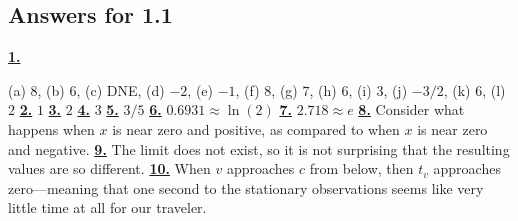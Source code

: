 \subsection *{Answers for 1.1}
\hypertarget {a:1.1.1}{\hyperlink {e:1.1.1}{\bfseries 1.}} \mdseries (a) $8$, (b) $6$, (c) DNE, (d) $-2$, (e) $-1$, (f) $8$, (g) $7$, (h) $6$, (i) $3$, (j) $-3/2$, (k) $6$, (l) $2$\qquad 
\hypertarget {a:1.1.2}{\hyperlink {e:1.1.2}{\bfseries 2.}} \mdseries $1$\qquad 
\hypertarget {a:1.1.3}{\hyperlink {e:1.1.3}{\bfseries 3.}} \mdseries $2$\qquad 
\hypertarget {a:1.1.4}{\hyperlink {e:1.1.4}{\bfseries 4.}} \mdseries $3$\qquad 
\hypertarget {a:1.1.5}{\hyperlink {e:1.1.5}{\bfseries 5.}} \mdseries $3/5$\qquad 
\hypertarget {a:1.1.6}{\hyperlink {e:1.1.6}{\bfseries 6.}} \mdseries $0.6931\approx \ln (2)$\qquad 
\hypertarget {a:1.1.7}{\hyperlink {e:1.1.7}{\bfseries 7.}} \mdseries $2.718 \approx e$\qquad 
\hypertarget {a:1.1.8}{\hyperlink {e:1.1.8}{\bfseries 8.}} \mdseries Consider what happens when $x$ is near zero and positive, as compared to when $x$ is near zero and negative.\qquad 
\hypertarget {a:1.1.9}{\hyperlink {e:1.1.9}{\bfseries 9.}} \mdseries The limit does not exist, so it is not surprising that the resulting values are so different.\qquad 
\hypertarget {a:1.1.10}{\hyperlink {e:1.1.10}{\bfseries 10.}} \mdseries When $v$ approaches $c$ from below, then $t_v$ approaches zero---meaning that one second to the stationary observations seems like very little time at all for our traveler.\qquad 
